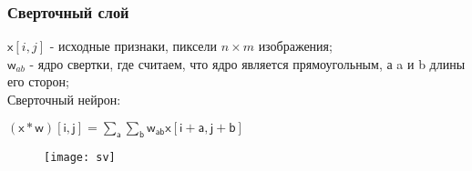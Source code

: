 \documentclass[unicode, notheorems]{beamer}
\begin{document}
\begin{frame}
	\frametitle{Сверточный слой}
	
	$\mathsf{x}[i,j]$ - исходные признаки, пиксели $n \times m$ изображения; \\
	$\mathsf{w}_{ab}$ - ядро свертки, где считаем, что ядро является прямоугольным, а a и b длины его сторон;%
	 \\
	Сверточный нейрон: %
	\begin{center}
		$(\mathsf{x} * \mathsf{w})[\mathsf{i},\mathsf{j}] = \sum \limits_{\mathsf{a}} \sum \limits_{\mathsf{b}} \mathsf{w}_{\mathsf{ab}} \mathsf{x}[\mathsf{i} + \mathsf{a}, \mathsf{j} + \mathsf{b}]$
	\end{center}

	

\begin{figure}[h]
	\begin{center}
		\begin{minipage}[h]{0.72\linewidth}
			\texttt{[image: sv]}
		\end{minipage}
	\end{center}
\end{figure}

\end{frame}
\end{document}
